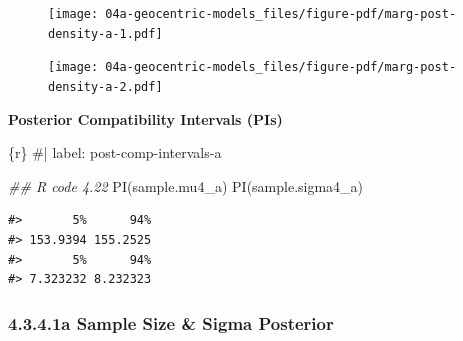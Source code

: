\documentclass[
  letterpaper,
  DIV=11,
  numbers=noendperiod]{scrreprt}
\newenvironment{Shaded}{\begin{snugshade}}{\end{snugshade}}
\newcommand{\CommentTok}[1]{\textcolor[rgb]{0.37,0.37,0.37}{#1}}
\newcommand{\DocumentationTok}[1]{\textcolor[rgb]{0.37,0.37,0.37}{\textit{#1}}}
\newcommand{\FunctionTok}[1]{\textcolor[rgb]{0.28,0.35,0.67}{#1}}
\newcommand{\InformationTok}[1]{\textcolor[rgb]{0.37,0.37,0.37}{#1}}
\newcommand{\NormalTok}[1]{\textcolor[rgb]{0.00,0.23,0.31}{#1}}
\begin{document}
\begin{figure}[H]

{\centering \texttt{[image: 04a-geocentric-models\_files/figure-pdf/marg-post-density-a-1.pdf]}

}

\end{figure}

\begin{figure}[H]

{\centering \texttt{[image: 04a-geocentric-models\_files/figure-pdf/marg-post-density-a-2.pdf]}

}

\end{figure}

\textbf{Posterior Compatibility Intervals (PIs)}

\begin{Shaded}
\begin{Highlighting}[]
\InformationTok{\textasciigrave{}\textasciigrave{}\textasciigrave{}\{r\}}
\CommentTok{\#| label: post{-}comp{-}intervals{-}a}

\DocumentationTok{\#\# R code 4.22}
\FunctionTok{PI}\NormalTok{(sample.mu4\_a)}
\FunctionTok{PI}\NormalTok{(sample.sigma4\_a)}
\InformationTok{\textasciigrave{}\textasciigrave{}\textasciigrave{}}
\end{Highlighting}
\end{Shaded}

\begin{verbatim}
#>       5%      94% 
#> 153.9394 155.2525 
#>       5%      94% 
#> 7.323232 8.232323
\end{verbatim}

\hypertarget{a-sample-size-sigma-posterior}{%
\subsubsection{4.3.4.1a Sample Size \& Sigma
Posterior}\label{a-sample-size-sigma-posterior}}
\end{document}
